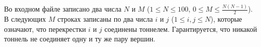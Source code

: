 Во входном файле записано два числа $N$ и $M$ ($1 \le N \le 100$, $0 \le M \le \frac{N(N - 1)}{2}$). В следующих $M$ строках записаны по два числа $i$ и $j$ ($1 \le i, j \le N$), которые означают, что перекрестки $i$ и $j$ соединены тоннелем. Гарантируется, что никакой тоннель не соединяет одну и ту же пару вершин.